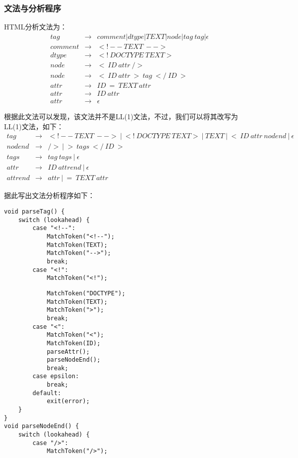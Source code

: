 \documentclass[a4paper]{article}
\begin{document}
\begin{CJK*}{UTF8}{gbsn}
    \subsubsection{文法与分析程序}
    HTML分析文法为：
    \begin{eqnarray*}
        tag&\rightarrow&comment|dtype|TEXT|node|tag~tag|\epsilon\\
        comment&\rightarrow&<!--~TEXT~-->\\
        dtype&\rightarrow&<!~DOCTYPE~TEXT>\\
        node&\rightarrow&<~ID~attr~/>\\
        node&\rightarrow&<~ID~attr~>~tag~</~ID~>\\
        attr&\rightarrow&ID~=~TEXT~attr\\
        attr&\rightarrow&ID~attr\\
        attr&\rightarrow&\epsilon
    \end{eqnarray*}
    \par 根据此文法可以发现，该文法并不是LL(1)文法，不过，我们可以将其改写为LL(1)文法，如下：
    \begin{eqnarray*}
        tag&\rightarrow&<!--~TEXT~-->~|~<!~DOCTYPE~TEXT>~|~TEXT~|~<~ID~attr~nodend~|~\epsilon\\
        nodend&\rightarrow&/>~|~>~tags~</~ID~>\\
        tags&\rightarrow&tag~tags~|~\epsilon\\
        attr&\rightarrow&ID~attrend~|~\epsilon\\
        attrend&\rightarrow&attr~|~=~TEXT~attr
    \end{eqnarray*}
    \par 据此写出文法分析程序如下：
    \begin{lstlisting}
void parseTag() {
    switch (lookahead) {
        case "<!--":
            MatchToken("<!--");
            MatchToken(TEXT);
            MatchToken("-->");
            break;
        case "<!":
            MatchToken("<!");
\end{lstlisting}\clearpage
\begin{lstlisting}
            MatchToken("DOCTYPE");
            MatchToken(TEXT);
            MatchToken(">");
            break;
        case "<":
            MatchToken("<");
            MatchToken(ID);
            parseAttr();
            parseNodeEnd();
            break;
        case epsilon:
            break;
        default:
            exit(error);
    }
}
void parseNodeEnd() {
    switch (lookahead) {
        case "/>":
            MatchToken("/>");

\end{lstlisting}
\end{CJK*}
\end{document}
